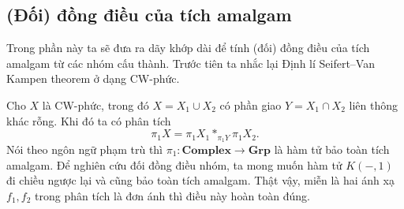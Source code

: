 
\subsection{(Đối) đồng điều của tích amalgam}
Trong phần này ta sẽ đưa ra dãy khớp dài để tính (đối) đồng điều của tích amalgam từ các nhóm cấu thành. Trước tiên ta nhắc lại Định lí Seifert–Van Kampen theorem ở dạng CW-phức.

\begin{theorem}
    Cho $X$ là CW-phức, trong đó $X = X_1 \cup X_2$ có phần giao $Y = X_1 \cap X_2$ liên thông khác rỗng. Khi đó ta có phân tích
    $$
        \pi_1 X = \pi_1 X_1 *_{\pi_1 Y} \pi_1 X_2.
    $$
    Nói theo ngôn ngữ phạm trù thì $\pi_1: \textbf{Complex} \rightarrow \textbf{Grp}$ là hàm tử bảo toàn tích amalgam. Để nghiên cứu đối đồng điều nhóm, ta mong muốn hàm tử $K(-,1)$ đi chiều ngược lại và cũng bảo toàn tích amalgam. Thật vậy, miễn là hai ánh xạ $f_1, f_2$ trong phân tích là đơn ánh thì điều này hoàn toàn đúng.
\end{theorem}

